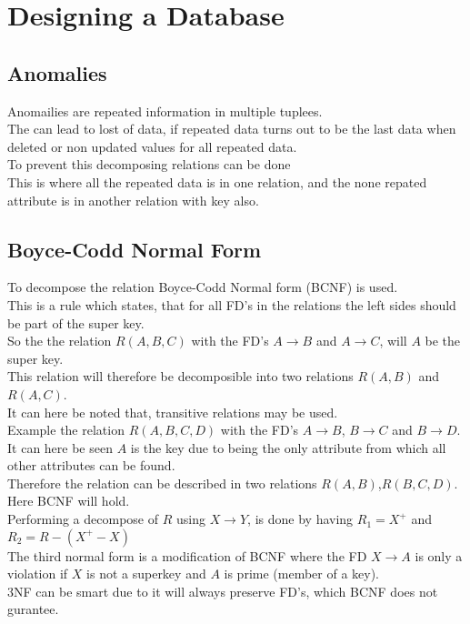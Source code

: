 \documentclass[12pt, a4paper]{article}
\begin{document}
	\section{Designing a Database}
		\subsection{Anomalies}
			Anomailies are repeated information in multiple tuplees.\\
			The can lead to lost of data, if repeated data turns out to be the last data when deleted or non updated values for all repeated data.\\
			To prevent this decomposing relations can be done\\
			This is where all the repeated data is in one relation, and the none repated attribute is in another relation with key also.\\
		\subsection{Boyce-Codd Normal Form}
			To decompose the relation Boyce-Codd Normal form (BCNF) is used.\\
			This is a rule which states, that for all FD's in the relations the left sides should be part of the super key.\\
			So the the relation $R(A,B,C)$ with the FD's $A\rightarrow B$ and $A\rightarrow C$, will $A$ be the super key.\\
			This relation will therefore be decomposible into two relations $R(A,B)$ and $R(A,C)$.\\
			It can here be noted that, transitive relations may be used.\\
			Example the relation $R(A,B,C,D)$ with the FD's $A\rightarrow B$, $B\rightarrow C$ and $B\rightarrow D$.\\
			It can here be seen $A$ is the key due to being the only attribute from which all other attributes can be found.\\
			Therefore the relation can be described in two relations $R(A,B)$,$R(B,C,D)$. Here BCNF will hold.\\
			Performing a decompose of $R$ using $X\rightarrow Y$, is done by having $R_1=X^+$ and $R_2=R-(X^+-X)$\\
			The third normal form is a modification of BCNF where the FD $X\rightarrow A$ is only a violation if $X$ is not a superkey and $A$ is prime (member of a key).\\
			3NF can be smart due to it will always preserve FD's, which BCNF does not gurantee.
\end{document}
